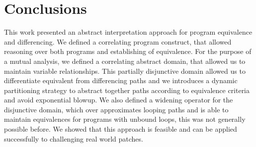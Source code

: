 \section{Conclusions} 

This work presented an abstract interpretation approach for program equivalence and differencing. We defined a correlating program construct, that allowed reasoning over both programs and establishing of equivalence. For the purpose of a mutual analysis, we defined a correlating abstract domain, that allowed us to maintain variable relationships. This partially disjunctive domain allowed us to differentiate equivalent from differencing paths and we introduces a dynamic partitioning strategy to abstract together paths according to equivalence criteria and avoid exponential blowup. We also defined a widening operator for the disjunctive domain, which over approximates looping paths and is able to maintain equivalences for programs with unbound loops, this was not generally possible before. We showed that this approach is feasible and can be applied successfully to challenging real world patches. 